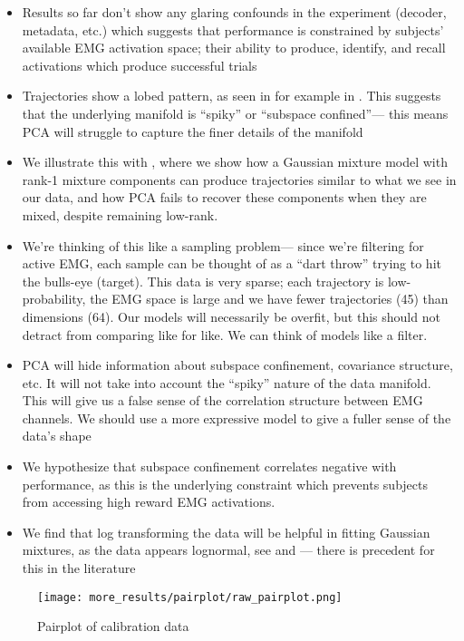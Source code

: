 \documentclass[../main.tex]{subfiles}
\begin{document}
\begin{itemize}
  \setlength\itemsep{0em}
  \item Results so far don't show any glaring confounds in the experiment (decoder, metadata, etc.) which suggests that performance is constrained by subjects' available EMG activation space; their ability to produce, identify, and recall activations which produce successful trials
  \item Trajectories show a lobed pattern, as seen in for example in . This suggests that the underlying manifold is ``spiky'' or ``subspace confined''--- this means PCA will struggle to capture the finer details of the manifold
  \item We illustrate this with , where we show how a Gaussian mixture model with rank-1 mixture components can produce trajectories similar to what we see in our data, and how PCA fails to recover these components when they are mixed, despite remaining low-rank. 
  \item We're thinking of this like a sampling problem--- since we're filtering for active EMG, each sample can be thought of as a ``dart throw'' trying to hit the bulls-eye (target). This data is very sparse; each trajectory is low-probability, the EMG space is large and we have fewer trajectories (45) than dimensions (64). Our models will necessarily be overfit, but this should not detract from comparing like for like. We can think of models like a filter.
  \item PCA will hide information about subspace confinement, covariance structure, etc. It will not take into account the “spiky” nature of the data manifold. This will give us a false sense of the correlation structure between EMG channels. We should use a more expressive model to give a fuller sense of the data's shape
  \item We hypothesize that subspace confinement correlates negative with performance, as this is the underlying constraint which prevents subjects from accessing high reward EMG activations.
  \item We find that log transforming the data will be helpful in fitting Gaussian mixtures, as the data appears lognormal, see  and  --- there is precedent for this in the literature \rbrack
\end{itemize}


\begin{figure}[tph]
  \centering
  \texttt{[image: more\_results/pairplot/raw\_pairplot.png]}
  \caption[Pairplot of calibration data]{Pairplot of calibration data}\label{fig:raw_pairplot}
\end{figure}
\end{document}
